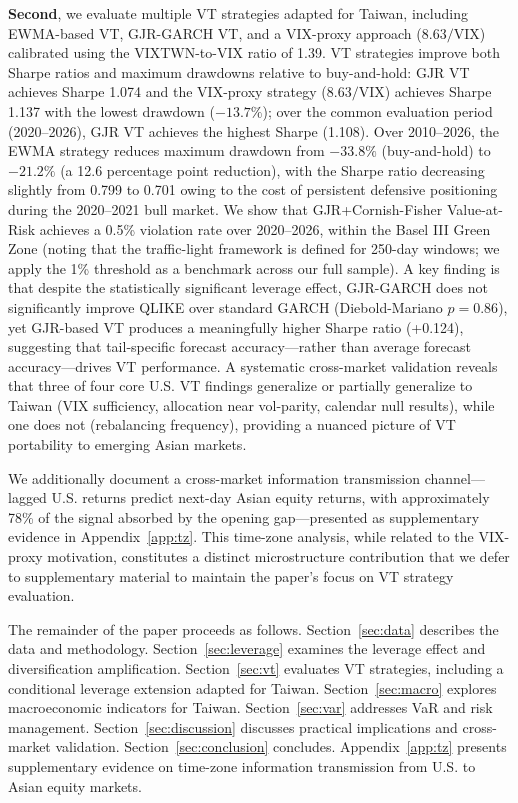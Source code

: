 \textbf{Second}, we evaluate multiple VT strategies adapted for Taiwan, including EWMA-based VT, GJR-GARCH VT, and a VIX-proxy approach ($8.63/\text{VIX}$) calibrated using the VIXTWN-to-VIX ratio of 1.39. VT strategies improve both Sharpe ratios and maximum drawdowns relative to buy-and-hold: GJR VT achieves Sharpe 1.074 and the VIX-proxy strategy ($8.63/\text{VIX}$) achieves Sharpe 1.137 with the lowest drawdown ($-13.7\%$); over the common evaluation period (2020--2026), GJR VT achieves the highest Sharpe (1.108). Over 2010--2026, the EWMA strategy reduces maximum drawdown from $-33.8\%$ (buy-and-hold) to $-21.2\%$ (a 12.6 percentage point reduction), with the Sharpe ratio decreasing slightly from 0.799 to 0.701 owing to the cost of persistent defensive positioning during the 2020--2021 bull market. We show that GJR+Cornish-Fisher Value-at-Risk achieves a 0.5\% violation rate over 2020--2026, within the Basel III Green Zone (noting that the traffic-light framework is defined for 250-day windows; we apply the 1\% threshold as a benchmark across our full sample). A key finding is that despite the statistically significant leverage effect, GJR-GARCH does not significantly improve QLIKE over standard GARCH (Diebold-Mariano $p = 0.86$), yet GJR-based VT produces a meaningfully higher Sharpe ratio (+0.124), suggesting that tail-specific forecast accuracy---rather than average forecast accuracy---drives VT performance. A systematic cross-market validation reveals that three of four core U.S. VT findings generalize or partially generalize to Taiwan (VIX sufficiency, allocation near vol-parity, calendar null results), while one does not (rebalancing frequency), providing a nuanced picture of VT portability to emerging Asian markets.

We additionally document a cross-market information transmission channel---lagged U.S. returns predict next-day Asian equity returns, with approximately 78\% of the signal absorbed by the opening gap---presented as supplementary evidence in Appendix~\ref{app:tz}. This time-zone analysis, while related to the VIX-proxy motivation, constitutes a distinct microstructure contribution that we defer to supplementary material to maintain the paper's focus on VT strategy evaluation.

The remainder of the paper proceeds as follows. Section~\ref{sec:data} describes the data and methodology. Section~\ref{sec:leverage} examines the leverage effect and diversification amplification. Section~\ref{sec:vt} evaluates VT strategies, including a conditional leverage extension adapted for Taiwan. Section~\ref{sec:macro} explores macroeconomic indicators for Taiwan. Section~\ref{sec:var} addresses VaR and risk management. Section~\ref{sec:discussion} discusses practical implications and cross-market validation. Section~\ref{sec:conclusion} concludes. Appendix~\ref{app:tz} presents supplementary evidence on time-zone information transmission from U.S. to Asian equity markets.


